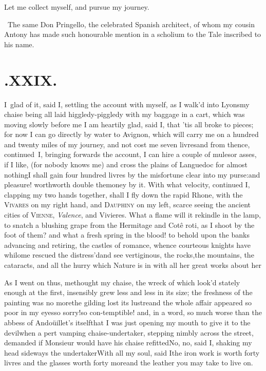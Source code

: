 \documentclass{article}
\begin{document}
\tsh Let me collect myself, and pursue my journey.

\bigskip
\bgroup\footnotesize
\indent\fnast\ The same Don Pringello, the
celebrated Spanish architect, of whom my cousin Antony has\break
made such honourable mention in a scholium to\break
the Tale inscribed to his name.\\\par
\egroup

\newpage
\section{.\enspace XXIX.}

\lettrine{I}{\,}
glad of it, said I, settling the account with myself, as I
walk’d into Lyons\tsh my chaise being all laid higgledy-piggledy
with my baggage in a cart, which was moving slowly before me\tsh
I am heartily glad, said I, that ’tis all broke to pieces; for
now I can go directly by water to Avignon, which will carry me
on a hundred and twenty miles of my journey, and not cost me
seven livres\tsh and from thence, continued~I, bringing forwards
the account, I can hire a couple of mules\tsk or asses, if I
like, (for nobody knows me) and cross the plains of Languedoc
for almost nothing\tsh I shall gain four hundred livres by the
misfortune clear into my purse:\pb and pleasure! worth\tsk worth
double the\break money by it. With what velocity, continued I,
clapping my two hands toge\-ther, shall I fly down the rapid
Rhone, with the \textsc{Vivares} on my right hand, and
\textsc{Dauphiny} on my left, scarce seeing the ancient cities
of \textsc{Vienne}, \textit{Valence}, and Vivieres. What a flame
will it rekindle in the lamp, to snatch a blushing grape from
the Hermitage and Cotê roti, as I shoot by the foot of them? and
what a fresh spring in the blood!  to behold upon the banks
advancing and retiring, the castles of romance, whence courteous
knights have whilome rescued the distress’d\tsh and see
vertiginous, the rocks,\break the mountains, the cataracts, and all
the hurry which Nature is in with all her great works about
her\tsh

\newpage
As I went on thus, methought my chaise, the wreck of which look’d stately
enough at the first, insensibly grew less and less in its size; the freshness
of the painting was no more\tsk the gilding lost its lustre\tsk and the
whole affair appeared so poor in my eyes\tsk so sorry!\tsk so
con-\break temptible!
and, in a word, so much worse than the abbess of Andoüillet’s
itself\tsk that I was just opening my mouth to give it to the
devil\tsk when a pert vamping chaise-undertaker, stepping nimbly across the
street, demanded if Monsieur would have his chaise refitted\tsk No,
no, said I, shaking my head sideways\tsk{}
the undertaker\tsk With all my soul, said\break
I\tsk the iron work is worth forty livres\tsk\break
and the glasses worth forty more\tsk and the leather
you may take to live on.
\end{document}

